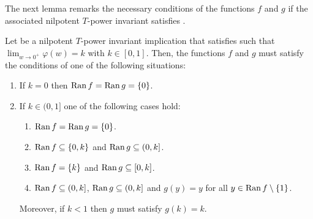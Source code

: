 The next lemma remarks the necessary conditions of the functions $f$ and $g$ if the associated nilpotent $T$-power invariant satisfies \EP.
\pagebreak

\begin{lemma}\label{lem:nilpotent:(EP)f&g2}
	Let \IT be a nilpotent $T$-power invariant implication that satisfies \EP such that $\displaystyle \lim_{w \to 0^+} \varphi (w) = k$ with $k \in [0,1]$. Then, the functions $f$ and $g$ must satisfy the conditions of one of the following situations:
	\begin{enumerate}[label=(\roman*)]
		\item If $k=0$ then $\operatorname{Ran} f = \operatorname{Ran} g = \{0\}$.
		\item If $k \in (0,1]$ one of the following cases hold:
		\begin{enumerate}[label=(\alph*)]
			\item $\operatorname{Ran} f = \operatorname{Ran} g = \{0\}$.
			\item $\operatorname{Ran} f \subseteq \{0,k\}$ and $\operatorname{Ran} g \subseteq (0,k]$.
			\item $\operatorname{Ran} f = \{k\}$ and $\operatorname{Ran} g \subseteq [0,k]$.
			\item $\operatorname{Ran} f \subseteq (0,k]$, $\operatorname{Ran} g \subseteq  (0,k]$ and $g(y) = y$ for all $y \in \operatorname{Ran} f \setminus \{1\}$.
		\end{enumerate}
		Moreover, if $k<1$ then $g$ must satisfy $g(k)=k$.
	\end{enumerate}
\end{lemma}

